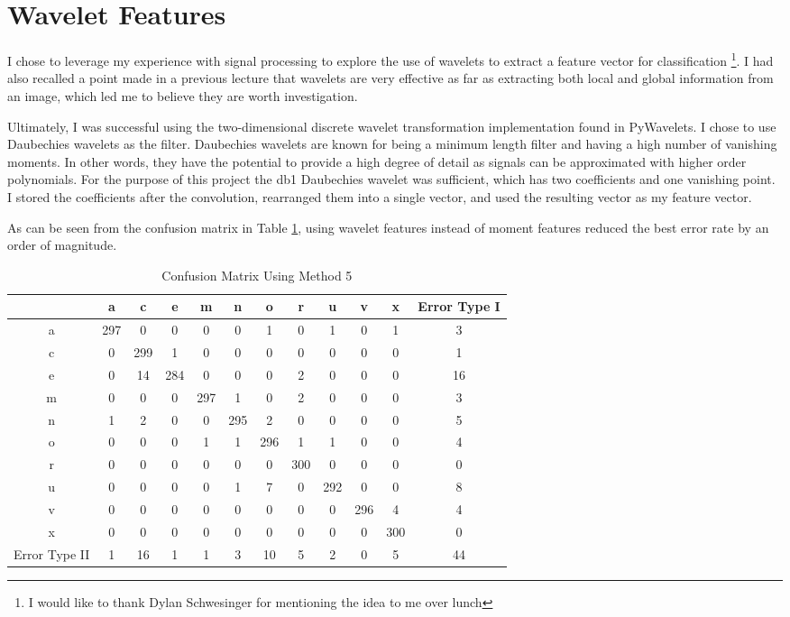 \documentclass[12pt]{article}
\begin{document}
\clearpage

\section{Wavelet Features}
I chose to leverage my experience with signal processing to explore the use of
wavelets to extract a feature vector for classification \footnote{I would like
to thank Dylan Schwesinger for mentioning the idea to me over lunch}. I had
also recalled a point made in a previous lecture that wavelets are very
effective as far as extracting both local and global information from an image,
which led me to believe they are worth investigation.

Ultimately, I was successful using the two-dimensional discrete wavelet
transformation implementation found in PyWavelets\cite{website:pywt}. I chose
to use Daubechies wavelets as the filter. Daubechies wavelets are known for
being a minimum length filter and having a high number of vanishing moments. In
other words, they have the potential to provide a high degree of detail as
signals can be approximated with higher order polynomials. For the purpose of
this project the db1 Daubechies wavelet was sufficient, which has two
coefficients and one vanishing point. I stored the coefficients after the
convolution, rearranged them into a single vector, and used the resulting
vector as my feature vector.

As can be seen from the confusion matrix in Table \ref{tab:wavelet}, using
wavelet features instead of moment features reduced the best error rate by an
order of magnitude.

\begin{table}[!ht]
    \centering
    \caption{Confusion Matrix Using Method 5}
    \begin{tabular}{| c | c | c | c | c | c | c | c | c | c | c | c |} \hline
        & a & c & e & m & n & o & r & u & v & x & Error Type I\\ \hline
      a & 297 & 0 & 0 & 0 & 0 & 1 & 0 & 1 & 0 & 1 & 3\\ \hline
      c & 0 & 299 & 1 & 0 & 0 & 0 & 0 & 0 & 0 & 0 & 1\\ \hline
      e & 0 & 14 & 284 & 0 & 0 & 0 & 2 & 0 & 0 & 0 & 16\\ \hline
      m & 0 & 0 & 0 & 297 & 1 & 0 & 2 & 0 & 0 & 0 & 3\\ \hline
      n & 1 & 2 & 0 & 0 & 295 & 2 & 0 & 0 & 0 & 0 & 5\\ \hline
      o & 0 & 0 & 0 & 1 & 1 & 296 & 1 & 1 & 0 & 0 & 4\\ \hline
      r & 0 & 0 & 0 & 0 & 0 & 0 & 300 & 0 & 0 & 0 & 0\\ \hline
      u & 0 & 0 & 0 & 0 & 1 & 7 & 0 & 292 & 0 & 0 & 8\\ \hline
      v & 0 & 0 & 0 & 0 & 0 & 0 & 0 & 0 & 296 & 4 & 4\\ \hline
      x & 0 & 0 & 0 & 0 & 0 & 0 & 0 & 0 & 0 & 300 & 0\\ \hline
Error Type II & 1 & 16 & 1 & 1 & 3 & 10 & 5 & 2 & 0 & 5 & 44\\ \hline
    \end{tabular}
    \label{tab:wavelet}
\end{table}
\end{document}
